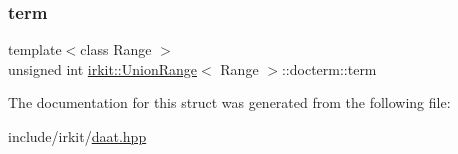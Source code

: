 \subsubsection{\texorpdfstring{term}{term}}
{\footnotesize\ttfamily template$<$class Range $>$ \\
unsigned int \mbox{\hyperlink{classirkit_1_1UnionRange}{irkit\+::\+Union\+Range}}$<$ Range $>$\+::docterm\+::term}



The documentation for this struct was generated from the following file\+:\begin{DoxyCompactItemize}
\item 
include/irkit/\mbox{\hyperlink{daat_8hpp}{daat.\+hpp}}\end{DoxyCompactItemize}
